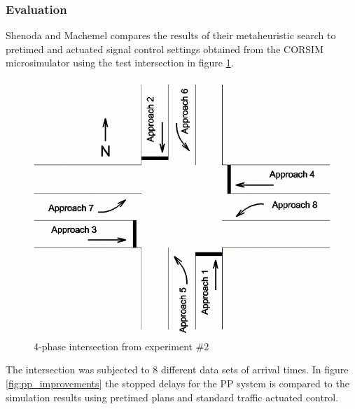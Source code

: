 \subsubsection*{Evaluation}
Shenoda and Machemel compares the results of their metaheuristic search to pretimed and actuated signal control settings obtained from the CORSIM microsimulator using the test intersection in figure \ref{fig:pp_intersection}.

\begin{figure}[!ht]
\begin{center}
\includegraphics[scale=0.5]{phase-by-phase_testing-intersection.png} 
\end{center}
\caption{4-phase intersection from experiment \#2}
\label{fig:pp_intersection}
\end{figure}

The intersection was subjected to 8 different data sets of arrival times. In figure \ref{fig:pp_improvements} the stopped delays for the PP system is compared to the simulation results using pretimed plans and standard traffic actuated control.

